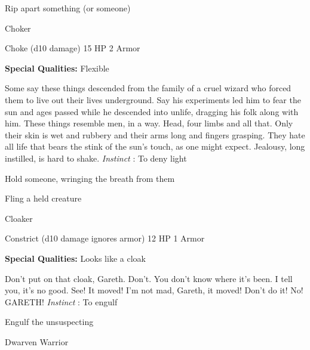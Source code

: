  
\item Rip apart something (or someone)


\stopitemize
 
\startMonsterName
Choker	 
\stopMonsterName
 

Choke (d10 damage)	15 HP	2 Armor

 


 
\startMonsterQualities
{\bf Special Qualities:}  Flexible
\stopMonsterQualities
 
\startMonsterDescription
Some say these things descended from the family of a cruel wizard who forced them to live out their lives underground. Say his experiments led him to fear the sun and ages passed while he descended into unlife, dragging his folk along with him. These things resemble men, in a way. Head, four limbs and all that. Only their skin is wet and rubbery and their arms long and fingers grasping. They hate all life that bears the stink of the sun’s touch, as one might expect. Jealousy, long instilled, is hard to shake. {\em Instinct} : To deny light
\stopMonsterDescription
 
\startitemize[1,packed]

\item Hold someone, wringing the breath from them

 
\item Fling a held creature


\stopitemize
 
\startMonsterName
Cloaker	 
\stopMonsterName
 

Constrict (d10 damage ignores armor)	12 HP	1 Armor

 


 
\startMonsterQualities
{\bf Special Qualities:}  Looks like a cloak
\stopMonsterQualities
 
\startMonsterDescription
Don’t put on that cloak, Gareth. Don’t. You don’t know where it’s been. I tell you, it’s no good. See! It moved! I’m not mad, Gareth, it moved! Don’t do it! No! GARETH! {\em Instinct} : To engulf
\stopMonsterDescription
 
\startitemize[1,packed]

\item Engulf the unsuspecting


\stopitemize
 
\startMonsterName
Dwarven Warrior	 
\stopMonsterName
 

